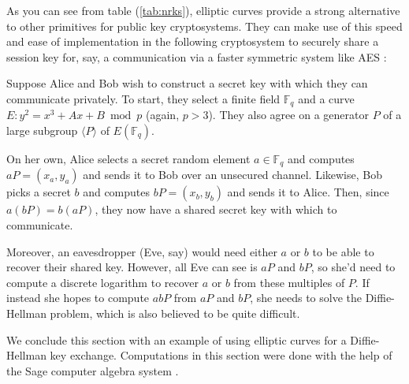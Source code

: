 As you can see from table (\ref{tab:nrks}), elliptic curves provide a strong
    alternative to other primitives for public key cryptosystems.
They can make use of this speed and ease of implementation in the following
    cryptosystem to securely share a session key for, say, a communication via
    a faster symmetric system like AES \cite{daemen2002design}:
\begin{cryp}
Suppose Alice and Bob wish to construct a secret key with which they can
    communicate privately.
To start, they select a finite field $\mathbb{F}_q$ and a curve
    $E: y^2 = x^3 + Ax + B \bmod p$ (again, $p > 3$).
They also agree on a generator $P$ of a large subgroup $\langle P \rangle$ of
    $E(\mathbb{F}_q)$.

On her own, Alice selects a secret random element $a \in \mathbb{F}_q$ and
    computes $aP = (x_a, y_a)$ and sends it to Bob over an unsecured channel.
Likewise, Bob picks a secret $b$ and computes $bP = (x_b, y_b)$ and sends it to
    Alice.
Then, since $a(bP) = b(aP)$, they now have a shared secret key with which to
    communicate.

Moreover, an eavesdropper (Eve, say) would need either $a$ or $b$ to be able to
    recover their shared key.
However, all Eve can see is $aP$ and $bP$, so she'd need to compute a discrete
    logarithm to recover $a$ or $b$ from these multiples of $P$.
If instead she hopes to compute $abP$ from $aP$ and $bP$, she needs to solve
    the Diffie-Hellman problem, which is also believed to be quite difficult.
\end{cryp}

We conclude this section with an example of using elliptic curves for a
    Diffie-Hellman key exchange.
Computations in this section were done with the help of the Sage computer
    algebra system \cite{sage}.

